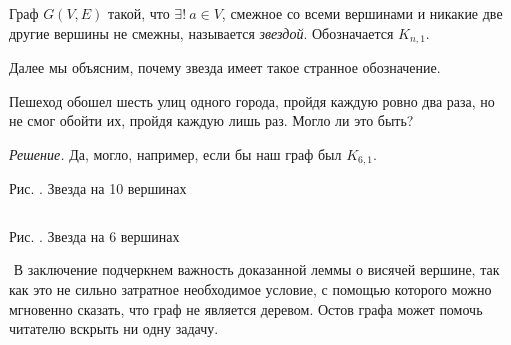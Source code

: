 \begin{paracol}{2}
\begin{definition}
	Граф $G(V, E)$ такой, что $\exists! \!\ a \in V$, смежное со всеми вершинами и никакие две другие вершины не смежны, называется \emph{звездой}. Обозначается $K_{n, 1}$.
\end{definition}

	Далее мы объясним, почему звезда имеет такое странное обозначение.

\begin{example}
	Пешеход обошел шесть улиц одного города, пройдя каждую ровно два раза, но не смог обойти их, пройдя каждую лишь раз. Могло ли это быть?
	
	\emph{Решение.} Да, могло, например, если бы наш граф был $K_{6, 1}$.
\end{example}

\switchcolumn
 
\begin{center}

	\small Рис. \images. Звезда на 10 вершинах
\end{center}
$ $
\newline
\begin{center}

	\small Рис. \images. Звезда на 6 вершинах
\end{center}
\end{paracol}

$ $
\newline
	В заключение подчеркнем важность доказанной леммы о висячей вершине, так как это не сильно затратное необходимое условие, с помощью которого можно мгновенно сказать, что граф не является деревом. Остов графа может помочь читателю вскрыть ни одну задачу.

